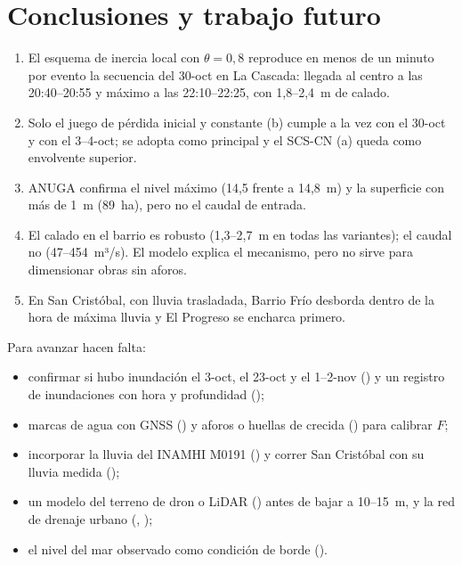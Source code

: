 \documentclass{sosg-informe}
\begin{document}
\section{Conclusiones y trabajo futuro}
\begin{enumerate}
  \item El esquema de inercia local con $\theta = 0,8$ reproduce en menos de un minuto por evento la secuencia del 30-oct en La Cascada: llegada al centro a las 20:40--20:55 y máximo a las 22:10--22:25, con 1,8--2,4~m de calado.
  \item Solo el juego de pérdida inicial y constante (b) cumple a la vez con el 30-oct y con el 3--4-oct; se adopta como principal y el SCS-CN (a) queda como envolvente superior.
  \item ANUGA confirma el nivel máximo (14,5 frente a 14,8~m) y la superficie con más de 1~m (89~ha), pero no el caudal de entrada.
  \item El calado en el barrio es robusto (1,3--2,7~m en todas las variantes); el caudal no (47--454~m³/s). El modelo explica el mecanismo, pero no sirve para dimensionar obras sin aforos.
  \item En San Cristóbal, con lluvia trasladada, Barrio Frío desborda dentro de la hora de máxima lluvia y El Progreso se encharca primero.
\end{enumerate}

Para avanzar hacen falta:
\begin{itemize}
  \item confirmar si hubo inundación el 3-oct, el 23-oct y el 1--2-nov () y un registro de inundaciones con hora y profundidad ();
  \item marcas de agua con GNSS () y aforos o huellas de crecida () para calibrar $F$;
  \item incorporar la lluvia del INAMHI M0191 () y correr San Cristóbal con su lluvia medida ();
  \item un modelo del terreno de dron o LiDAR () antes de bajar a 10--15~m, y la red de drenaje urbano (, );
  \item el nivel del mar observado como condición de borde ().
\end{itemize}
\end{document}
